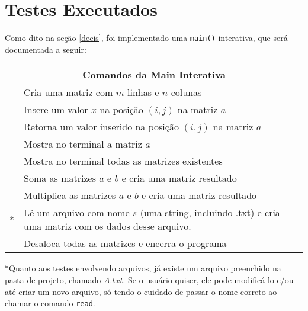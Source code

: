 \documentclass[12pt, letterpaper]{article}
\begin{document}
	\section{Testes Executados} \label{tests}
		Como dito na seção \ref{decis}, foi implementado uma \verb|main()| interativa, que será documentada a seguir:
		\begin{center}
			\begin{tabular}{|p{4cm}||p{8cm}|}
				\hline
				\multicolumn{2}{|c|}{Comandos da Main Interativa} \\ \hline
				\hline
				\centering{\verb|create m n|}     & Cria uma matriz com $m$ linhas e $n$ colunas \\ \hline
				\centering{\verb|insert i j x a|} & Insere um valor $x$ na posição $(i, j)$ na matriz $a$ \\ \hline
				\centering{\verb|get i j a|}      & Retorna um valor inserido na posição $(i, j)$ na matriz $a$ \\ \hline
				\centering{\verb|show a|}         & Mostra no terminal a matriz $a$ \\ \hline
				\centering{\verb|showAll|}        & Mostra no terminal todas as matrizes existentes \\ \hline
				\centering{\verb|sum a b|}        & Soma as matrizes $a$ e $b$ e cria uma matriz resultado \\ \hline
				\centering{\verb|mult a b|}       & Multiplica as matrizes $a$ e $b$ e cria uma matriz resultado \\ \hline
				\centering{\verb|read s|}*        & Lê um arquivo com nome $s$ (uma string, incluindo .txt) e cria uma matriz com os dados desse arquivo. \\ \hline
				\centering{\verb|exit|}           & Desaloca todas as matrizes e encerra o programa \\ \hline
			\end{tabular}
			
		\end{center}
			*Quanto aos testes envolvendo arquivos, já existe um arquivo preenchido na pasta de projeto, chamado $A.txt$. Se o usuário quiser, ele pode modificá-lo e/ou até criar um novo arquivo, só tendo o cuidado de passar o nome correto ao chamar o comando \verb|read|.
\end{document}
